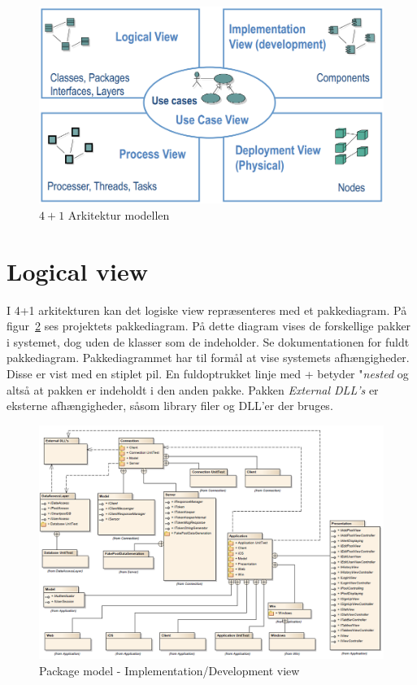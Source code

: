 \begin{figure}[h]
	\centering
	\includegraphics[width=0.9\linewidth]{figs/arkitektur/41model}
	\caption{$4+1$ Arkitektur modellen \cite{flylib}}
	\label{fig:41model}
\end{figure}

\section{Logical view}
I 4+1 arkitekturen kan det logiske view repræsenteres med et pakkediagram.
På figur~\ref{fig:packageDiagram} ses projektets pakkediagram. På dette diagram vises de forskellige pakker i systemet, dog uden de klasser som de indeholder. Se dokumentationen for fuldt pakkediagram.
Pakkediagrammet har til formål at vise systemets afhængigheder. Disse er vist med en stiplet pil. En fuldoptrukket linje med + betyder "\textit{nested} og altså at pakken er indeholdt i den anden pakke. Pakken \textit{External DLL's} er eksterne afhængigheder, såsom library filer og DLL'er der bruges.

\begin{landscape}
	\begin{figure}[H]
		\centering
		\includegraphics[width=\linewidth]{figs/arkitektur/packageDiagramNoImpl.PNG}
		\caption{Package model - Implementation/Development view}
		\label{fig:packageDiagram}
	\end{figure}
\end{landscape}

